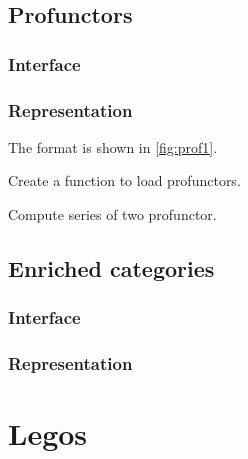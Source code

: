 \section{Profunctors}




\label{sec:exercises-profunctors}

\subsection*{Interface}


\subsection*{Representation}

The format is shown in \cref{fig:prof1}.




\begin{exercise}
  Create a function to load profunctors.

%

\end{exercise}


\begin{exercise}
  Compute series of two profunctor.
%
\end{exercise}


\section{Enriched categories}

\subsection*{Interface}


\subsection*{Representation}


\chapter{Legos}
\label{ch:exercises-legos}


